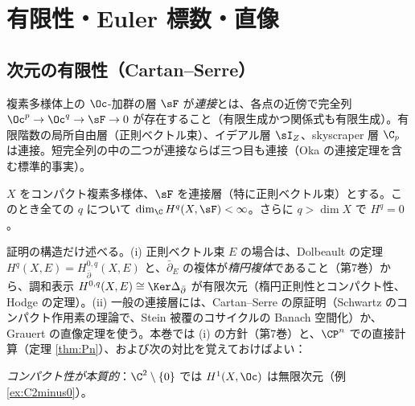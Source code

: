 \section{有限性・Euler 標数・直像}\label{sec:finite}

\subsection{次元の有限性（Cartan--Serre）}
\begin{defn}[連接層（概要）]
複素多様体上の $\Oc$-加群の層 $\sF$ が\emph{連接}とは、各点の近傍で完全列 $\Oc^{p}\to\Oc^{q}\to\sF\to0$ が存在すること（有限生成かつ関係式も有限生成）。有限階数の局所自由層（正則ベクトル束）、イデアル層 $\sI_Z$、skyscraper 層 $\C_p$ は連接。短完全列の中の二つが連接ならば三つ目も連接（Oka の連接定理を含む標準的事実）。\tC
\end{defn}
\begin{thm}\label{thm:CS}\tC
$X$ をコンパクト複素多様体、$\sF$ を連接層（特に正則ベクトル束）とする。このとき全ての $q$ について $\dim_{\C}H^q(X,\sF)<\infty$。さらに $q>\dim X$ で $H^q=0$。
\end{thm}
証明の構造だけ述べる。(i) 正則ベクトル束 $E$ の場合は、Dolbeault の定理 $H^q(X,E)=H^{0,q}_{\bar\partial}(X,E)$ と、$\bar\partial_E$ の複体が\emph{楕円複体}であること（第7巻）から、調和表示 $H^{0,q}(X,E)\cong\Ker\Delta_{\bar\partial}$ が有限次元（楕円正則性とコンパクト性、Hodge の定理）。(ii) 一般の連接層には、Cartan--Serre の原証明（Schwartz のコンパクト作用素の理論で、Stein 被覆のコサイクルの Banach 空間化）か、Grauert の直像定理を使う。本巻では (i) の方針（第7巻）と、$\CP^n$ での直接計算（定理 \ref{thm:Pn}）、および次の対比を覚えておけばよい：

\emph{コンパクト性が本質的}：$\C^2\setminus\{0\}$ では $H^1(X,\Oc)$ は無限次元（例 \ref{ex:C2minus0}）。

